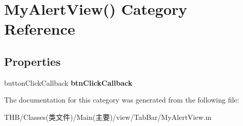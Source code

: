 \hypertarget{category_my_alert_view_07_08}{}\section{My\+Alert\+View() Category Reference}
\label{category_my_alert_view_07_08}
\subsection*{Properties}
\begin{DoxyCompactItemize}
\item 
\mbox{\label{category_my_alert_view_07_08_a8831615fc8d6471f672f86c816332ed1}} 
button\+Click\+Callback {\bfseries btn\+Click\+Callback}
\end{DoxyCompactItemize}


The documentation for this category was generated from the following file\+:\begin{DoxyCompactItemize}
\item 
T\+H\+B/\+Classes(类文件)/\+Main(主要)/view/\+Tab\+Bar/My\+Alert\+View.\+m\end{DoxyCompactItemize}
